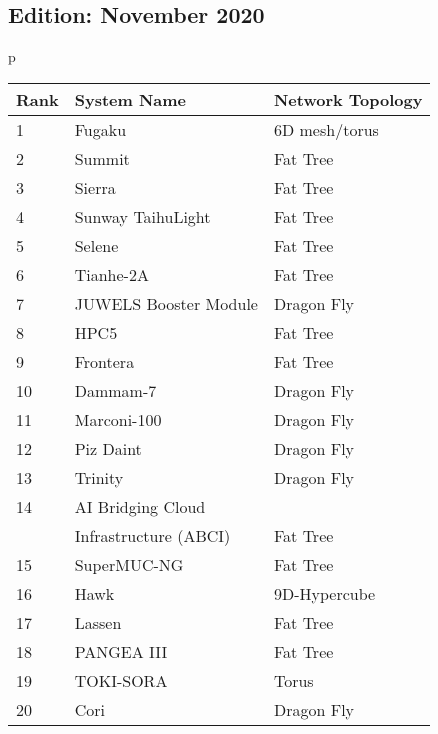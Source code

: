 \documentclass{article}
\begin{document}
\hfill
\begin{minipage}{0.45\textwidth}
\subsection{Edition: November 2020}
\label{sec:edition:-nov-2020}
\begin{tabular}{p{\textwidth}}
\begin{tabular}[H]{||l|l|l||} \hline\hline
  Rank & System Name           & Network Topology \\ \hline\hline
  1    & Fugaku                & 6D mesh/torus    \\ \hline
  2    & Summit                & Fat Tree         \\ \hline
  3    & Sierra                & Fat Tree         \\ \hline
  4    & Sunway TaihuLight     & Fat Tree         \\ \hline
  5    & Selene                & Fat Tree         \\ \hline
  6    & Tianhe-2A             & Fat Tree         \\ \hline
  7    & JUWELS Booster Module & Dragon Fly       \\ \hline
  8    & HPC5                  & Fat Tree         \\ \hline
  9    & Frontera              & Fat Tree         \\ \hline
  10   & Dammam-7              & Dragon Fly       \\ \hline
  11   & Marconi-100           & Dragon Fly       \\ \hline
  12   & Piz Daint             & Dragon Fly       \\ \hline
  13   & Trinity               & Dragon Fly       \\ \hline
  14   & AI Bridging Cloud     &                  \\
       & Infrastructure (ABCI) & Fat Tree         \\ \hline
  15   & SuperMUC-NG           & Fat Tree         \\ \hline
  16   & Hawk                  & 9D-Hypercube     \\ \hline
  17   & Lassen                & Fat Tree         \\ \hline
  18   & PANGEA III            & Fat Tree         \\ \hline
  19   & TOKI-SORA             & Torus            \\ \hline
  20   & Cori                  & Dragon Fly       \\ \hline\hline
\end{tabular}
\end{tabular}
\end{minipage}
\end{document}
